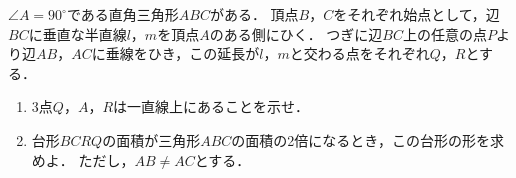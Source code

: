 \documentclass[../../main.tex]{subfiles}
\begin{document}
$\angle A={90}^\circ$である直角三角形$ABC$がある．
頂点$B$，$C$をそれぞれ始点として，辺$BC$に垂直な半直線$l$，$m$を頂点$A$のある側にひく．
つぎに辺$BC$上の任意の点$P$より辺$AB$，$AC$に垂線をひき，この延長が$l$，$m$と交わる点をそれぞれ$Q$，$R$とする．
\begin{enumerate}
  \item 3点$Q$，$A$，$R$は一直線上にあることを示せ．
  \item 台形$BCRQ$の面積が三角形$ABC$の面積の2倍になるとき，この台形の形を求めよ．
    ただし，$AB \neq AC$とする．
\end{enumerate}
\end{document}
